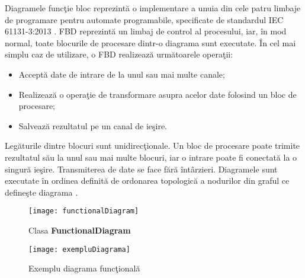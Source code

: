 Diagramele funcţie bloc reprezintă o implementare a unuia din cele patru limbaje de programare pentru automate programabile, specificate de standardul IEC 61131-3:2013 \autocite[128-140]{IEC61131-3}. FBD reprezintă un limbaj de control al procesului, iar, în mod normal, toate blocurile de procesare dintr-o diagrama sunt executate.
În cel mai simplu caz de utilizare, o FBD realizează următoarele operaţii:
\begin{itemize}
	\item Acceptă date de intrare de la unul sau mai multe canale;
	\item Realizează o operaţie de transformare asupra acelor date folosind un bloc de procesare;
	\item Salvează rezultatul pe un canal de ieşire.
\end{itemize}
Legăturile dintre blocuri sunt unidirecţionale. Un bloc de procesare poate trimite rezultatul său la unul sau mai multe blocuri, iar o intrare poate fi conectată la o singură ieşire. Transmiterea de date se face fără întârzieri. Diagramele sunt executate în ordinea definită de ordonarea topologică a nodurilor din graful ce defineşte diagrama \autocite[20-50]{IEC61499}. 
\begin{figure}[H]
	\centering
	\texttt{[image: functionalDiagram]}
	\caption{Clasa \textbf{FunctionalDiagram}}
\end{figure}

\begin{figure}[H]
	\centering
	\texttt{[image: exempluDiagrama]}
	\caption{Exemplu diagrama funcţională}
	\label{fig:exempluDiagrama}
\end{figure}

